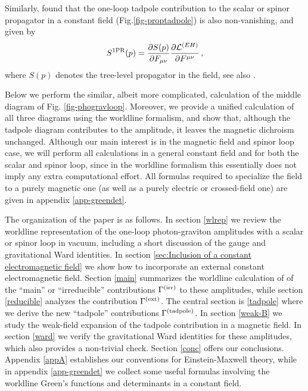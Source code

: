 \documentclass[a4paper,11pt]{article}
\begin{document}
Similarly, \cite{112,113} found that the one-loop tadpole contribution to the scalar or spinor propagator in a constant field 
(Fig.\ref{fig-proptadpole})
is also non-vanishing, and
given by
%
\begin{equation}
S^{\rm 1PR}(p)  = 	\frac{\partial S(p)}{\partial F_{\mu\nu}}\frac{\partial \mathcal{L}^{(EH)}}{\partial F^{\mu\nu}}  \,,
	\nonumber
\end{equation}
where $S(p)$ denotes the tree-level propagator in the field, see also \citep{ahedil-19}. 

Below we perform the similar, albeit more complicated, calculation of the middle diagram of Fig. \ref{fig-phogravloop}.
Moreover, we provide a unified calculation of all three diagrams using the worldline formalism, and show that, although the tadpole diagram contributes to the amplitude, it leaves the magnetic dichroism unchanged.
 Although our main interest is in the magnetic field and spinor loop case, we will perform all calculations in a general constant field and for both the scalar and spinor loop,
 since in the worldline formalism this essentially does not imply any extra computational effort. 
 All formulas required to specialize the field to a purely magnetic one (as well as a purely electric or
 crossed-field one) are given in appendix \ref{app-greendet}.

The organization of the paper is as follows. In section \ref{wlrep} we review the
worldline representation of the one-loop photon-graviton amplitudes with a scalar or spinor loop in vacuum,
including a short discussion of the gauge and gravitational Ward identities.
In section  \ref{sec:Inclusion of a constant electromagnetic field}
we show how to incorporate an external constant electromagnetic field. 
Section \ref{main} summarizes the worldline calculation of \cite{61,71} of the ``main'' or ``irreducible'' contributions
$\Gamma^{\rm (irr)}$ to these amplitudes, while section \ref{reducible} analyzes the contribution $\Gamma^{\rm (ext)}$. 
The central section is \ref{tadpole} where we derive the new ``tadpole'' contributions $\Gamma^{\rm (tadpole)}$. In section \ref{weak-B} we study the weak-field expansion of the tadpole contribution in a magnetic field. 
In section \ref{ward} we verify the gravitational Ward identities for these amplitudes, which also provides a non-trivial check. 
Section \ref{conc} offers our conclusions. 
Appendix \ref{appA} establishes our conventions for Einstein-Maxwell theory,
while in appendix \ref{app-greendet} we collect some useful formulas involving the
worldline Green's functions and determinants in a constant field.
\end{document}
